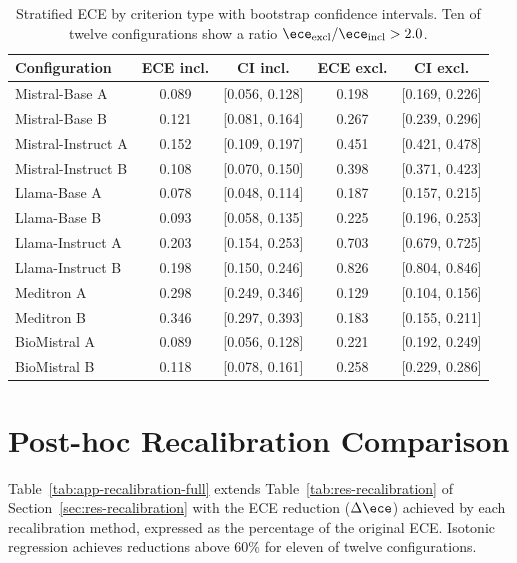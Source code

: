 \begin{table}[htbp]
    \centering
    \caption{Stratified ECE by criterion type with bootstrap confidence 
        intervals. Ten of twelve configurations show a ratio 
        $\ece_{\text{excl}} / \ece_{\text{incl}} > 2.0$.}
    \label{tab:app-stratified}
    \small
    \begin{tabular}{@{}lcccc@{}}
        \toprule
        \textbf{Configuration} & 
        \textbf{ECE incl.} & 
        \textbf{CI incl.} & 
        \textbf{ECE excl.} & 
        \textbf{CI excl.} \\
        \midrule
        Mistral-Base A     & 0.089 & [0.056, 0.128] & 0.198 & [0.169, 0.226] \\
        Mistral-Base B     & 0.121 & [0.081, 0.164] & 0.267 & [0.239, 0.296] \\
        Mistral-Instruct A & 0.152 & [0.109, 0.197] & 0.451 & [0.421, 0.478] \\
        Mistral-Instruct B & 0.108 & [0.070, 0.150] & 0.398 & [0.371, 0.423] \\
        Llama-Base A       & 0.078 & [0.048, 0.114] & 0.187 & [0.157, 0.215] \\
        Llama-Base B       & 0.093 & [0.058, 0.135] & 0.225 & [0.196, 0.253] \\
        Llama-Instruct A   & 0.203 & [0.154, 0.253] & 0.703 & [0.679, 0.725] \\
        Llama-Instruct B   & 0.198 & [0.150, 0.246] & 0.826 & [0.804, 0.846] \\
        Meditron A         & 0.298 & [0.249, 0.346] & 0.129 & [0.104, 0.156] \\
        Meditron B         & 0.346 & [0.297, 0.393] & 0.183 & [0.155, 0.211] \\
        BioMistral A       & 0.089 & [0.056, 0.128] & 0.221 & [0.192, 0.249] \\
        BioMistral B       & 0.118 & [0.078, 0.161] & 0.258 & [0.229, 0.286] \\
        \bottomrule
    \end{tabular}
\end{table}

\section{Post-hoc Recalibration Comparison}
\label{sec:app-recalibration-full}

Table~\ref{tab:app-recalibration-full} extends 
Table~\ref{tab:res-recalibration} of Section~\ref{sec:res-recalibration} 
with the ECE reduction ($\Delta\ece$) achieved by each recalibration 
method, expressed as the percentage of the original ECE. Isotonic 
regression achieves reductions above $60\%$ for eleven of twelve 
configurations.

